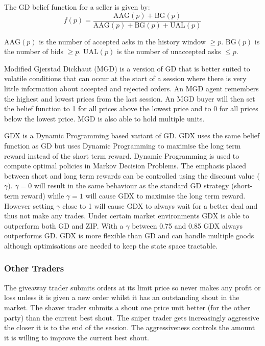 \documentclass[preprint]{acm_proc_article-sp} %
\begin{document}
The GD belief function for a seller is given by:
\begin{equation}
  f(p) = \frac{\text{AAG}(p) + \text{BG}(p)}{\text{AAG}(p) + \text{BG}(p) +
  \text{UAL}(p)}
\end{equation}

$\text{AAG}(p)$ is the number of accepted asks in the history window $\geq p$.
$\text{BG}(p)$ is
the number of bids $\geq p$. $\text{UAL}(p)$ is the number of unaccepted asks $\leq p$.

Modified Gjerstad Dickhaut (MGD) \cite{mgd} is a version of GD that
is better suited to volatile conditions that can occur at the start of a
session where there is very little information about accepted and rejected
orders.
An MGD agent remembers the highest and lowest prices from the last session.
An MGD buyer will then set the belief function to 1 for all prices above the
lowest price and to 0 for all prices below the lowest price.
MGD is also able to hold multiple units.

GDX \cite{gdx} is a Dynamic Programming based variant of GD.
GDX uses the same belief function as GD but uses Dynamic Programming to
maximise the long term reward instead of the short term reward.
Dynamic Programming is used to compute optimal policies in Markov Decision
Problems.
The emphasis placed between short and long term rewards can be controlled using
the discount value ($\gamma$).
$\gamma = 0$ will result in the same behaviour as the standard GD strategy
(short-term reward) while $\gamma = 1$ will cause GDX to maximise the long term
reward.
However setting $\gamma$ close to 1 will cause GDX to always wait for a better
deal and thus not make any trades.
Under certain market environments GDX is able to outperform
both GD and ZIP.
With a $\gamma$ between 0.75 and 0.85 GDX always outperforms GD.
GDX is more flexible than GD and can handle multiple goods although
optimisations are needed to keep the state space tractable.\\


\subsubsection{Other Traders}
The giveaway trader submits orders at its limit price so never makes any profit
or loss unless it is given a new order whilst it has an outstanding shout in
the market. The shaver trader submits a shout one price unit better (for the
other party) than the current best shout. The sniper trader gets increasingly
aggressive the closer it is to the end of the session. The aggressiveness
controls the amount it is willing to improve the current best shout.\\
\end{document}
